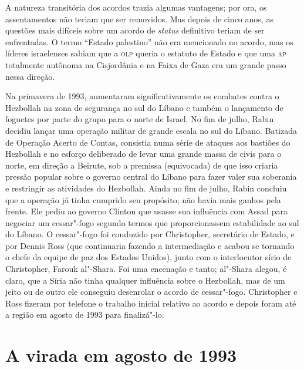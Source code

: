 A natureza transitória dos acordos trazia algumas vantagens; por ora, os
assentamentos não teriam que ser removidos. Mas depois de cinco anos, as
questões mais difíceis sobre um acordo de \emph{status} definitivo teriam de
ser enfrentadas. O termo ``Estado palestino'' não era mencionado no
acordo, mas os líderes israelenses sabiam que a \textsc{olp} queria o estatuto de
Estado e que uma \textsc{ap} totalmente autônoma na Cisjordânia e na Faixa de
Gaza era um grande passo nessa direção.

Na primavera de 1993, aumentaram significativamente os combates contra o
Hezbollah na zona de segurança no sul do Líbano e também o lançamento de
foguetes por parte do grupo para o norte de Israel. No fim de julho,
Rabin decidiu lançar uma operação militar de grande escala no sul do
Líbano. Batizada de Operação Acerto de Contas, consistia numa série de
ataques aos bastiões do Hezbollah e no esforço deliberado de levar uma
grande massa de civis para o norte, em direção a Beirute, sob a premissa
(equivocada) de que isso criaria pressão popular sobre o governo central
do Líbano para fazer valer sua soberania e restringir as atividades do
Hezbollah. Ainda no fim de julho, Rabin concluiu que a operação já tinha
cumprido seu propósito; não havia mais ganhos pela frente. Ele pediu ao
governo Clinton que usasse sua influência com Assad para negociar um
cessar"-fogo segundo termos que proporcionassem estabilidade ao sul do
Líbano. O cessar"-fogo foi conduzido por Christopher, secretário de
Estado, e por Dennis Ross (que continuaria fazendo a intermediação e
acabou se tornando o chefe da equipe de paz dos Estados Unidos), junto
com o interlocutor sírio de Christopher, Farouk al"-Shara. Foi uma
encenação e tanto; al"-Shara alegou, é claro, que a Síria não tinha
qualquer influência sobre o Hezbollah, mas de um jeito ou de outro ele
conseguiu desenrolar o acordo de cessar"-fogo. Christopher e Ross fizeram
por telefone o trabalho inicial relativo ao acordo e depois foram até a
região em agosto de 1993 para finalizá"-lo.

\section{A virada em agosto de 1993}

